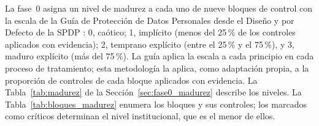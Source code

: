 \label{anx:madurez}

La fase~0 asigna un nivel de madurez a cada uno de nueve bloques de control con la escala de la Guía de Protección de Datos Personales desde el Diseño y por Defecto de la SPDP \cite[cap.~3]{spdp2025diseno}: 0, caótico; 1, implícito (menos del 25\,\% de los controles aplicados con evidencia); 2, temprano explícito (entre el 25\,\% y el 75\,\%), y 3, maduro explícito (más del 75\,\%). La guía aplica la escala a cada principio en cada proceso de tratamiento; esta metodología la aplica, como adaptación propia, a la proporción de controles de cada bloque aplicados con evidencia. La Tabla~\ref{tab:madurez} de la Sección~\ref{sec:fase0_madurez} describe los niveles. La Tabla~\ref{tab:bloques_madurez} enumera los bloques y sus controles; los marcados como críticos determinan el nivel institucional, que es el menor de ellos.

